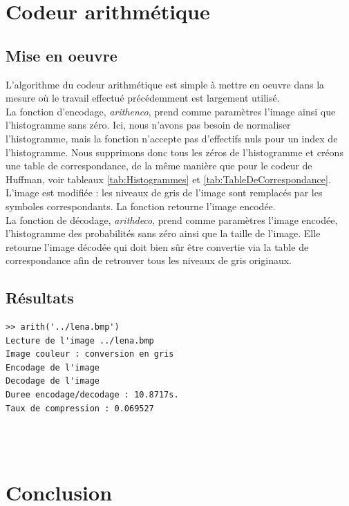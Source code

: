 \documentclass[a4paper, 12pt]{article}
\begin{document}
\section{Codeur arithmétique}

\subsection{Mise en oeuvre}

L'algorithme du codeur arithmétique est simple à mettre en oeuvre dans la mesure où le travail effectué précédemment est largement utilisé. \\

La fonction d'encodage, \textit{arithenco}, prend comme paramètres l'image ainsi que l'histogramme sans zéro. Ici, nous n'avons pas besoin de normaliser l'histogramme, mais la fonction n'accepte pas d'effectifs nuls pour un index de l'histogramme. Nous supprimons donc tous les zéros de l'histogramme et créons une table de correspondance, de la même manière que pour le codeur de Huffman, voir tableaux \ref{tab:Histogrammes} et \ref{tab:TableDeCorrespondance}. L'image est modifiée : les niveaux de gris de l'image sont remplacés par les symboles correspondants. La fonction retourne l'image encodée.\\

La fonction de décodage, \textit{arithdeco}, prend comme paramètres l'image encodée, l'histogramme des probabilités sans zéro ainsi que la taille de l'image. Elle retourne l'image décodée qui doit bien sûr être convertie via la table de correspondance afin de retrouver tous les niveaux de gris originaux. \\

\subsection{Résultats}

\begin{verbatim}
>> arith('../lena.bmp')
Lecture de l'image ../lena.bmp
Image couleur : conversion en gris
Encodage de l'image
Decodage de l'image
Duree encodage/decodage : 10.8717s.
Taux de compression : 0.069527
\end{verbatim} \\

\\

\section{Conclusion}
\end{document}
